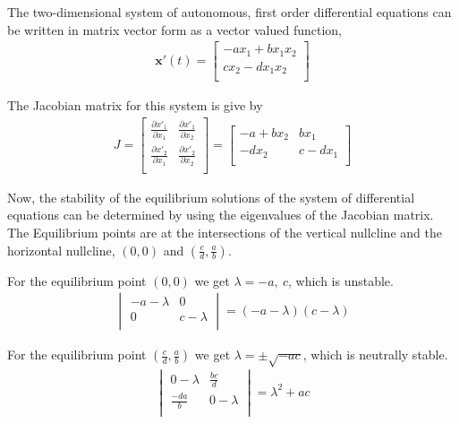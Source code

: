 \documentclass[12pt]{article}   %
\theoremstyle{definition}
\numberwithin{equation}{section}
\begin{document}
The two-dimensional system of autonomous, first order differential equations can be written in matrix vector form as a vector valued function, 
\begin{align*} 
\textbf{x}'(t) 
= 
\begin{bmatrix}
     -ax_1 + bx_1x_2\\
     cx_2 - dx_1x_2\\
\end{bmatrix}
\end{align*}

The Jacobian matrix for this system is give by
\begin{align*} 
J 
=
\begin{bmatrix}
     \frac{\partial{x'_1}}{\partial{x_1}} & \frac{\partial{x'_1}}{\partial{x_2}}\\
     \frac{\partial{x'_2}}{\partial{x_1}} &  \frac{\partial{x'_2}}{\partial{x_2}}\\
\end{bmatrix}
=
\begin{bmatrix}
     -a+bx_2 & bx_1\\
     -dx_2 & c-dx_1\\
\end{bmatrix}
\end{align*}

Now, the stability of the equilibrium solutions of the system of differential equations can be determined by using the eigenvalues of the Jacobian matrix. The Equilibrium points are at the intersections of the vertical nullcline and the horizontal nullcline, $(0,0)$ and $(\frac{c}{d},\frac{a}{b})$.  

For the equilibrium point $(0,0)$ we get $\lambda=-a,\ c$, which is unstable.
\begin{align*}
\begin{vmatrix}
	-a-\lambda &0\\
	0& c-\lambda\\
\end{vmatrix}
=(-a-\lambda)(c-\lambda)
\end{align*}

For the equilibrium point $(\frac{c}{d},\frac{a}{b})$ we get $\lambda=\pm\sqrt{-ac}$, which is neutrally stable.
\begin{align*}
\begin{vmatrix}
	0-\lambda & \frac{bc}{d}\\
	\frac{-da}{b} & 0-\lambda\\
\end{vmatrix}
=\lambda^2+ac
\end{align*}
\end{document}
